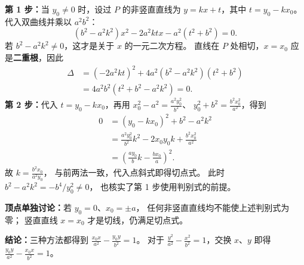 \begin{proofbox}
\textbf{第 1 步：}当 $y_0\ne0$ 时，设过 $P$ 的非竖直直线为
$y=kx+t$，其中 $t=y_0-kx_0$。
代入双曲线并乘以 $a^2b^2$：
\[
 (b^2-a^2k^2)x^2-2a^2ktx-a^2(t^2+b^2)=0.
\]
若 $b^2-a^2k^2\ne0$，这才是关于 $x$ 的一元二次方程。
直线在 $P$ 处相切，$x=x_0$ 应是\textbf{二重根}，因此
\[
 \begin{aligned}
 \Delta
 &=(-2a^2kt)^2+4a^2(b^2-a^2k^2)(t^2+b^2)\\
 &=4a^2b^2(t^2+b^2-a^2k^2)=0.
 \end{aligned}
\]
\textbf{第 2 步：}代入 $t=y_0-kx_0$，再用
$x_0^2-a^2=\frac{a^2y_0^2}{b^2}$、
$y_0^2+b^2=\frac{b^2x_0^2}{a^2}$，得到
\[
 \begin{aligned}
 0&=(y_0-kx_0)^2+b^2-a^2k^2\\
  &=\frac{a^2y_0^2}{b^2}k^2-2x_0y_0k+\frac{b^2x_0^2}{a^2}\\
  &=\left(\frac{ay_0}{b}k-\frac{bx_0}{a}\right)^2.
 \end{aligned}
\]
故 $\displaystyle k=\frac{b^2x_0}{a^2y_0}$，
与前两法一致，代入点斜式即得切点式。
此时 $b^2-a^2k^2=-b^4/y_0^2\ne0$，
也核实了第 1 步使用判别式的前提。

\textbf{顶点单独讨论：}若 $y_0=0$、$x_0=\pm a$，
任何非竖直直线均不能使上述判别式为零；
竖直直线 $x=x_0$ 才是切线，仍满足切点式。

\textbf{结论：}三种方法都得到
$\boxed{\frac{x_0x}{a^2}-\frac{y_0y}{b^2}=1}$。
对于 $\frac{y^2}{a^2}-\frac{x^2}{b^2}=1$，交换 $x$、$y$ 即得
$\boxed{\frac{y_0y}{a^2}-\frac{x_0x}{b^2}=1}$。
\end{proofbox}
